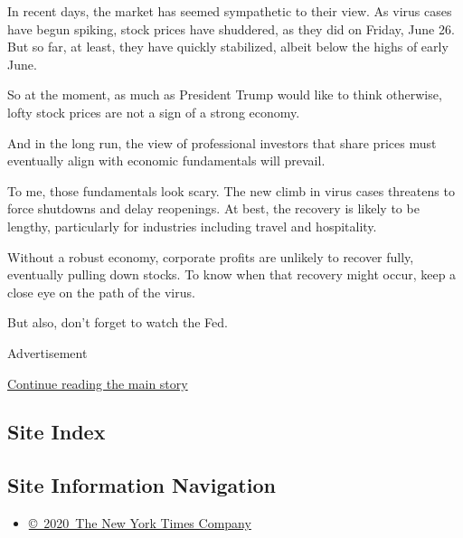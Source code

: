 In recent days, the market has seemed sympathetic to their view. As
virus cases have begun spiking, stock prices have shuddered, as they did
on Friday, June 26. But so far, at least, they have quickly stabilized,
albeit below the highs of early June.

So at the moment, as much as President Trump would like to think
otherwise, lofty stock prices are not a sign of a strong economy.

And in the long run, the view of professional investors that share
prices must eventually align with economic fundamentals will prevail.

To me, those fundamentals look scary. The new climb in virus cases
threatens to force shutdowns and delay reopenings. At best, the recovery
is likely to be lengthy, particularly for industries including travel
and hospitality.

Without a robust economy, corporate profits are unlikely to recover
fully, eventually pulling down stocks. To know when that recovery might
occur, keep a close eye on the path of the virus.

But also, don't forget to watch the Fed.

Advertisement

\protect\hyperlink{after-bottom}{Continue reading the main story}

\hypertarget{site-index}{%
\subsection{Site Index}\label{site-index}}

\hypertarget{site-information-navigation}{%
\subsection{Site Information
Navigation}\label{site-information-navigation}}

\begin{itemize}
\tightlist
\item
  \href{https://help.nytimes3xbfgragh.onion/hc/en-us/articles/115014792127-Copyright-notice}{©~2020~The
  New York Times Company}
\end{itemize}


